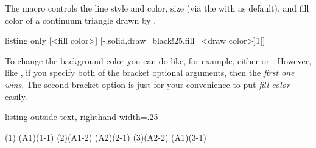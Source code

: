 The macro \icmd{\cntmpreset} controls the line style and color, size (via the  with  as default), and fill color of a continuum triangle drawn by \cmd{\istrootcntm}.

\begin{tcblisting}{listing only}
  [<fill color>]
  [-,solid,draw=black!25,fill=<draw color>]{1}[]
\end{tcblisting}

To change the background color you can do like, for example, either \xw{\cntmpreset[blue!20]} or .
However, like \xw{\cntmpreset[blue!20][red!20]}, if you specify both of the bracket optional arguments, then the \emph{first one wins}. The second bracket option is just for your convenience to put \emph{fill color} easily.

\begin{tcblisting}{listing outside text, righthand width=.25\linewidth}
\begin{istgame}[font=\scriptsize]
\cntmdistance*{10mm}{20mm}{3mm}
\istrootcntm(1)
  \istb \istbm \endist
\istroot(A1)(1-1)
  \istb \istb  \endist
\cntmpreset[draw=blue,dashed][red!20]
\istrootcntm(2)(A1-2)
  \istb \istbm \endist
\istroot(A2)(2-1)
  \istb \istb  \endist
\cntmpreset[blue!20][red!20]
\istrootcntm(3)(A2-2)
  \istb \istbm \endist
\istroot(A1)(3-1)
  \istb \istb  \endist
\end{istgame}
\end{tcblisting}




